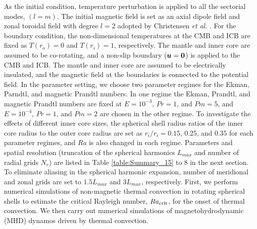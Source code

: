 As the initial condition, temperature perturbation is applied to all the sectorial modes, $(l = m)$. 
The initial magnetic field is set as an axial dipole field and zonal toroidal field with degree $l=2$ adopted by Christensen {\it et al.} . 
For the boundary condition, the non-dimensional temperatures at the CMB and ICB are fixed as $T(r_{o}) = 0$ and  $T(r_{i}) = 1$, respectively. 
The mantle and inner core are assumed to be co-rotating, and a non-slip boundary ($\mbox{\boldmath$u$} = \mbox{\boldmath$0$}$) is applied to the CMB and ICB. 
The mantle and inner core are assumed to be electrically insulated, and the magnetic field at the boundaries is connected to the potential field.
In the parameter setting, 
{\color{blue}
we choose two parameter regimes for the Ekman, Parndtl, and magnetic Prandtl numbers. In one regime the Ekman, Prandtl, and magnetic Prandtl numbers are fixed at $E = 10^{-3}$, $Pr = 1$, and $Pm = 5$, and  $E = 10^{-4}$, $Pr = 1$, and $Pm = 2$ are chosen in the other regime. To investigate the effects of different inner core sizes, the spherical shell radius ratios of the inner core radius to the outer core radius are set as $r_{i} / r_{i} = 0.15$, 0.25, and 0.35 for each parameter regimes, and $Ra$ is also changed in each regime. Parameters and spatial resolution (truncation of the spherical harmonics $L_{max}$ and number of radial grids $N_{r}$) are listed in Table \ref{table:Summary_15} to 8 
in the next section. To eliminate aliasing in the spherical harmonic expansion, number of meridional and zonal grids are set to $1.5 L_{max}$ and $3 L_{max}$, respectively.
}
First, we perform numerical simulations of non-magnetic thermal convection in rotating spherical shells to estimate the critical Rayleigh number, $Ra_{\rm crit}$, for the onset of thermal convection. 
We then carry out numerical simulations of magnetohydrodynamic (MHD) dynamos driven by thermal convection. 
